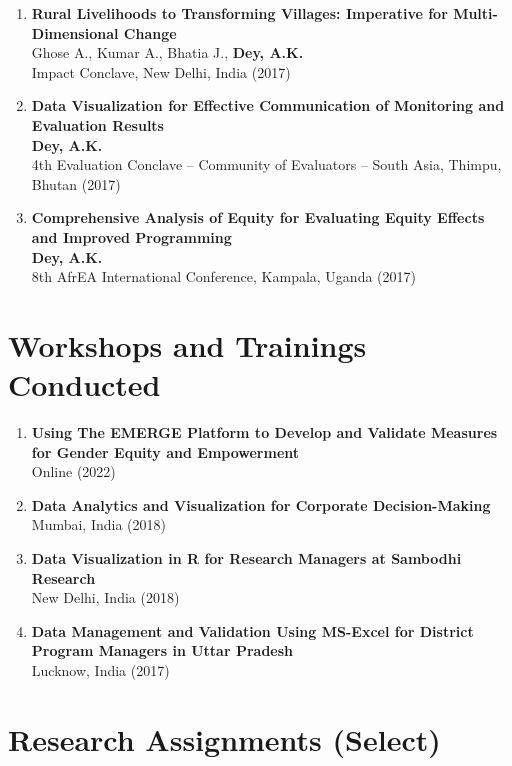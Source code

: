 \documentclass[13pt,letterpaper]{article}
\begin{document}
\begin{enumerate}
\item \textbf{Rural Livelihoods to Transforming Villages: Imperative for Multi-Dimensional Change}\\
Ghose A., Kumar A., Bhatia J., \textbf{Dey, A.K.}\\
Impact Conclave, New Delhi, India (2017) 

\item \textbf{Data Visualization for Effective Communication of Monitoring and Evaluation Results}\\
\textbf{Dey, A.K.}\\
4th Evaluation Conclave – Community of Evaluators – South Asia, Thimpu, Bhutan (2017) 

\item \textbf{Comprehensive Analysis of Equity for Evaluating Equity Effects and Improved Programming}\\
\textbf{Dey, A.K.}\\
8th AfrEA International Conference, Kampala, Uganda (2017) 
\end{enumerate}
\section*{Workshops and Trainings Conducted}
\label{sec:org1aa23f2}

\begin{enumerate}
\item \textbf{Using The EMERGE Platform to Develop and Validate Measures for Gender Equity and Empowerment} \\
Online (2022) 

\item \textbf{Data Analytics and Visualization for Corporate Decision-Making} \\
Mumbai, India (2018) 

\item \textbf{Data Visualization in R for Research Managers at Sambodhi Research} \\
New Delhi, India (2018) 

\item \textbf{Data Management and Validation Using MS-Excel for District Program Managers in Uttar Pradesh} \\
Lucknow, India (2017) 
\end{enumerate}
\section*{Research Assignments (Select)}
\label{sec:org0529754}
\end{document}
